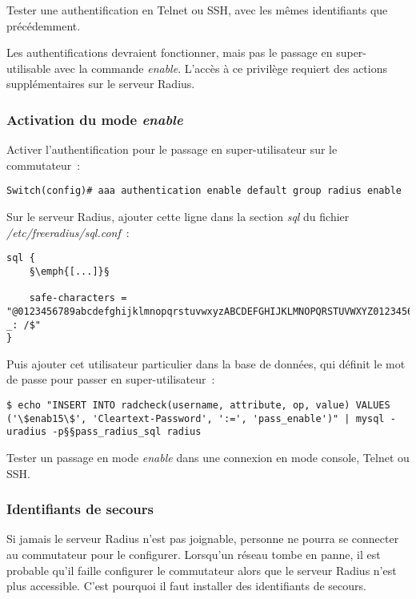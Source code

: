 Tester une authentification en Telnet ou SSH, avec les mêmes identifiants que précédemment.

Les authentifications devraient fonctionner, mais pas le passage en super-utilisable avec la commande \emph{enable}. L'accès à ce privilège requiert des actions supplémentaires sur le serveur Radius.

\subsubsection{Activation du mode \emph{enable}}

Activer l'authentification pour le passage en super-utilisateur sur le commutateur~:

\begin{lstlisting}[morekeywords=0]
Switch(config)# aaa authentication enable default group radius enable
\end{lstlisting}

Sur le serveur Radius, ajouter cette ligne dans la section \emph{sql} du fichier \emph{/etc/freeradius/sql.conf}~:

\begin{lstlisting}
sql {
	§\emph{[...]}§

	safe-characters = "@0123456789abcdefghijklmnopqrstuvwxyzABCDEFGHIJKLMNOPQRSTUVWXYZ0123456789.-_: /$"
}
\end{lstlisting}

Puis ajouter cet utilisateur particulier dans la base de données, qui définit le mot de passe pour passer en super-utilisateur~:

\begin{lstlisting}
$ echo "INSERT INTO radcheck(username, attribute, op, value) VALUES ('\$enab15\$', 'Cleartext-Password', ':=', 'pass_enable')" | mysql -uradius -p§§pass_radius_sql radius
\end{lstlisting}

Tester un passage en mode \emph{enable} dans une connexion en mode console, Telnet ou SSH.

\subsubsection{Identifiants de secours}

Si jamais le serveur Radius n'est pas joignable, personne ne pourra se connecter au commutateur pour le configurer. Lorsqu'un réseau tombe en panne, il est probable qu'il faille configurer le commutateur alors que le serveur Radius n'est plus accessible. C'est pourquoi il faut installer des identifiants de secours.

